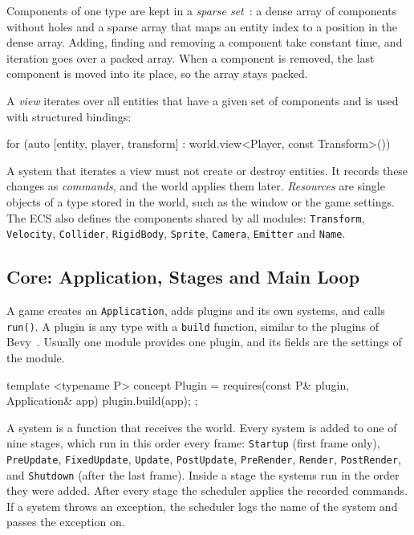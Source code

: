 \documentclass[conference]{IEEEtran}
\newcommand{\code}[1]{\texttt{#1}}
\begin{document}
Components of one type are kept in a \emph{sparse set}~\cite{entt}: a dense array of
components without holes and a sparse array that maps an entity index to a position in
the dense array. Adding, finding and removing a component take constant time, and
iteration goes over a packed array. When a component is removed, the last component is
moved into its place, so the array stays packed.

A \emph{view} iterates over all entities that have a given set of components and is used
with structured bindings:
\begin{codeblock}
for (auto [entity, player, transform] :
     world.view<Player, const Transform>())
\end{codeblock}
A system that iterates a view must not create or destroy entities. It records these
changes as \emph{commands}, and the world applies them later. \emph{Resources} are single
objects of a type stored in the world, such as the window or the game settings. The ECS
also defines the components shared by all modules: \code{Transform}, \code{Velocity},
\code{Collider}, \code{RigidBody}, \code{Sprite}, \code{Camera}, \code{Emitter} and
\code{Name}.

\subsection{Core: Application, Stages and Main Loop}

A game creates an \code{Application}, adds plugins and its own systems, and calls
\code{run()}. A plugin is any type with a \code{build} function, similar to the plugins
of Bevy~\cite{bevy}. Usually one module provides one plugin, and its fields are the
settings of the module.

\begin{codeblock}
template <typename P>
concept Plugin = requires(const P& plugin,
                          Application& app) {
    plugin.build(app);
};
\end{codeblock}

A system is a function that receives the world. Every system is added to one of nine
stages, which run in this order every frame:
\code{Startup} (first frame only), \code{PreUpdate}, \code{FixedUpdate},
\code{Update}, \code{PostUpdate}, \code{PreRender}, \code{Render}, \code{PostRender}, and
\code{Shutdown} (after the last frame). Inside a stage the systems run in the order they
were added. After every stage the scheduler applies the recorded commands. If a system
throws an exception, the scheduler logs the name of the system and passes the exception on.
\end{document}
